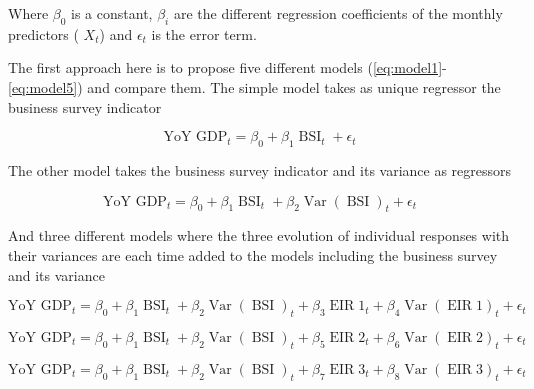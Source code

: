 \documentclass[12pt,a4paper,oneside]{book}
\DeclareMathOperator{\Var}{Var}
\DeclareMathOperator{\BSI}{BSI}
\DeclareMathOperator{\EIR}{EIR}
\begin{document}
Where $\beta_{0}$ is a constant, $\beta_{i}$  are the different regression coefficients of the monthly predictors ( $X_{t}$) and $\epsilon_t$ is the error term.

The first approach here is to propose five different models (\autoref{eq:model1}-\ref{eq:model5}) and compare them.
The simple model takes as unique regressor the business survey indicator

\begin{equation} \tag{Model 1}
    \text{YoY GDP}_{t} = \beta_0 + \beta_{1} \BSI_{t} + \epsilon_t \label{eq:model1} 
\end{equation}

The other model takes the business survey indicator and its variance as regressors

\begin{equation} \tag{Model 2}
    \text{YoY GDP}_{t} = \beta_0 + \beta_{1} \BSI_{t}  + \beta_{2} \Var(\BSI)_{t} + \epsilon_t \label{eq:model2}
\end{equation}

And three different models where the three evolution of individual responses with their variances are each time added to the models including the business survey and its variance

\begin{equation} \tag{Model 3}
    \text{YoY GDP}_{t} = \beta_0 + \beta_{1} \BSI_{t}  + \beta_{2} \Var(\BSI)_{t} + \beta_{3} \EIR1_{t}  + \beta_{4} \Var(\EIR1)_{t} + \epsilon_t \label{eq:model3}
\end{equation}

\begin{equation} \tag{Model 4}
    \text{YoY GDP}_{t} = \beta_0 + \beta_{1} \BSI_{t}  + \beta_{2} \Var(\BSI)_{t} + \beta_{5} \EIR2_{t}  + \beta_{6} \Var(\EIR2)_{t} + \epsilon_t \label{eq:model4}
\end{equation}


\begin{equation} \tag{Model 5}
    \text{YoY GDP}_{t} = \beta_0 + \beta_{1} \BSI_{t}  + \beta_{2} \Var(\BSI)_{t} + \beta_{7} \EIR3_{t}  + \beta_{8} \Var(\EIR3)_{t} + \epsilon_t  \label{eq:model5}
\end{equation}
\end{document}

